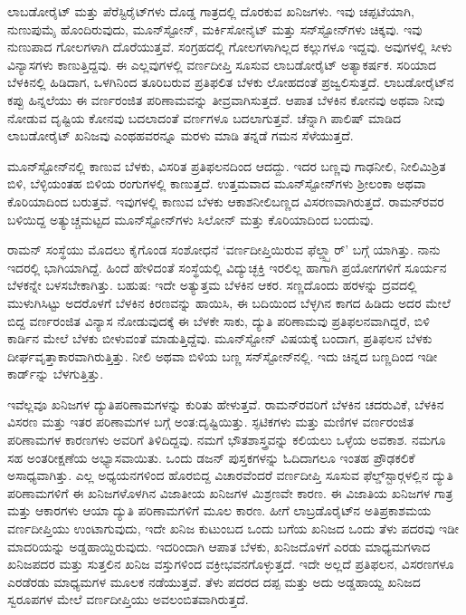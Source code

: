 ಲಾಬಡೋರೈಟ್ ಮತ್ತು ಪೆರೆಸ್ಟಿರೈಟ್‍ಗಳು ದೊಡ್ಡ ಗಾತ್ರದಲ್ಲಿ ದೊರಕುವ ಖನಿಜಗಳು. ಇವು ಚಪ್ಪಟೆಯಾಗಿ, ನುಣುಪುಮೈ ಹೊಂದಿರುವುದು, ಮೂನ್‍ಸ್ಟೋನ್, ಮರ್ಕಿಸೋನೈಟ್ ಮತ್ತು ಸನ್‍ಸ್ಟೋನ್‍ಗಳು ಚಿಕ್ಕವು. ಇವು ನುಣುಪಾದ ಗೋಲಗಳಾಗಿ ದೊರೆಯುತ್ತವೆ. ಸಂಗ್ರಹದಲ್ಲಿ ಗೋಲಗಳಾಗಿಲ್ಲದ ಕಲ್ಲುಗಳೂ ಇದ್ದವು. ಅವುಗಳಲ್ಲಿ ಸೀಳು ವಿನ್ಯಾಸಗಳು ಕಾಣುತ್ತಿದ್ದವು. ಈ ಎಲ್ಲವುಗಳಲ್ಲಿ ವರ್ಣದೀಪ್ತಿ ಸೂಸುವ ಲಾಬಡೋರೈಟ್ ಅತ್ಯಾಕರ್ಷಕ. ಸರಿಯಾದ ಬೆಳಕಿನಲ್ಲಿ ಹಿಡಿದಾಗ, ಒಳಗಿನಿಂದ ತೂರಿಬರುವ ಪ್ರತಿಫಲಿತ ಬೆಳಕು ಲೋಹದಂತೆ ಪ್ರಜ್ವಲಿಸುತ್ತದೆ. ಲಾಬಡೋರೈಟ್‍ನ ಕಪ್ಪು ಹಿನ್ನಲೆಯು ಈ ವರ್ಣರಂಜಿತ ಪರಿಣಾಮವನ್ನು ತೀವ್ರವಾಗಿಸುತ್ತದೆ. ಆಪಾತ ಬೆಳಕಿನ ಕೋನವು ಅಥವಾ ನೀವು ನೋಡುವ ದೃಷ್ಟಿಯ ಕೋನವು ಬದಲಾದಂತೆ ವರ್ಣಗಳೂ ಬದಲಾಗುತ್ತವೆ. ಚೆನ್ನಾಗಿ ಪಾಲಿಷ್ ಮಾಡಿದ ಲಾಬಡೋರೈಟ್ ಖನಿಜವು ಎಂಥಹವರನ್ನೂ ಮರಳು ಮಾಡಿ ತನ್ನಡೆ ಗಮನ ಸೆಳೆಯುತ್ತದೆ.

ಮೂನ್‍ಸ್ಟೋನ್‍ನಲ್ಲಿ ಕಾಣುವ ಬೆಳಕು, ವಿಸರಿತ ಪ್ರತಿಫಲನದಿಂದ ಆದದ್ದು. ಇದರ ಬಣ್ಣವು ಗಾಢನೀಲಿ, ನೀಲಿಮಿಶ್ರಿತ ಬಿಳಿ, ಬೆಳ್ಳಿಯಂತಹ ಬಿಳಿಯ ರಂಗುಗಳಲ್ಲಿ ಕಾಣುತ್ತದೆ. ಉತ್ತಮವಾದ ಮೂನ್‍ಸ್ಟೋನ್‍ಗಳು ಶ‍್ರೀಲಂಕಾ ಅಥವಾ ಕೊರಿಯಾದಿಂದ ಬರುತ್ತವೆ. ಇವುಗಳಲ್ಲಿ ಕಾಣುವ ಬೆಳಕು ಆಕಾಶನೀಲಿಬಣ್ಣದ ವಿಸರಣವಾಗಿರುತ್ತದೆ. ರಾಮನ್‍ರವರ ಬಳಿಯಿದ್ದ ಅತ್ಯುಚ್ಚಮಟ್ಟದ ಮೂನ್‍ಸ್ಟೋನ್‍ಗಳು ಸಿಲೋನ್ ಮತ್ತು ಕೊರಿಯಾದಿಂದ ಬಂದುವು.

ರಾಮನ್ ಸಂಸ್ಥೆಯು ಮೊದಲು ಕೈಗೊಂಡ ಸಂಶೋಧನೆ ‘ವರ್ಣದೀಪ್ತಿಯಿರುವ ಫೆಲ್ಡ್ಸ್ಪಾರ್’ ಬಗ್ಗೆ ಯಾಗಿತ್ತು. ನಾನು ಇದರಲ್ಲಿ ಭಾಗಿಯಾಗಿದ್ದೆ. ಹಿಂದೆ ಹೇಳಿದಂತೆ ಸಂಸ್ಥೆಯಲ್ಲಿ ವಿದ್ಯುಚ್ಛಕ್ತಿ ಇರಲಿಲ್ಲ ಹಾಗಾಗಿ ಪ್ರಯೋಗಗಳಿಗೆ ಸೂರ್ಯನ ಬೆಳಕನ್ನೇ ಬಳಸಬೇಕಾಗಿತ್ತು. ಬಹುಷ: ಇದೇ ಅತ್ಯುತ್ತಮ ಬೆಳಕಿನ ಆಕರ. ಸಣ್ಣದೊಂದು ಹರಳನ್ನು ದ್ರವದಲ್ಲಿ ಮುಳುಗಿಸಿಟ್ಟು ಅದರೊಳಗೆ ಬೆಳಕಿನ ಕಿರಣವನ್ನು ಹಾಯಿಸಿ, ಈ ಬದಿಯಿಂದ ಬೆಳ್ಳಗಿನ ಕಾಗದ ಹಿಡಿದು ಅದರ ಮೇಲೆ ಬಿದ್ದ ವರ್ಣರಂಜಿತ ವಿನ್ಯಾಸ ನೋಡುವುದಕ್ಕೆ ಈ ಬೆಳಕೇ ಸಾಕು, ದ್ಯುತಿ ಪರಿಣಾಮವು ಪ್ರತಿಫಲನವಾಗಿದ್ದರೆ, ಬಿಳಿ ಕಾರ್ಡಿನ ಮೇಲೆ ಬೆಳಕು ಬೀಳುವಂತೆ ಮಾಡುತ್ತಿದ್ದೆವು. ಮೂನ್‍ಸ್ಟೋನ್ ವಿಷಯಕ್ಕೆ ಬಂದಾಗ, ಪ್ರತಿಫಲನ ಬೆಳಕು ದೀರ್ಘವೃತ್ತಾಕಾರವಾಗಿರುತ್ತಿತ್ತು. ನೀಲಿ ಅಥವಾ ಬಿಳಿಯ ಬಣ್ಣ ಸನ್‍ಸ್ಟೋನ್‍ನಲ್ಲಿ. ಇದು ಚಿನ್ನದ ಬಣ್ಣದಿಂದ ಇಡೀ ಕಾರ್ಡ್‌ನ್ನು ಬೆಳಗುತ್ತಿತ್ತು.

ಇವೆಲ್ಲವೂ ಖನಿಜಗಳ ದ್ಯುತಿಪರಿಣಾಮಗಳನ್ನು ಕುರಿತು ಹೇಳುತ್ತವೆ. ರಾಮನ್‍ರವರಿಗೆ ಬೆಳಕಿನ ಚದರುವಿಕೆ, ಬೆಳಕಿನ ವಿಸರಣ ಮತ್ತು ಇತರ ಪರಿಣಾಮಗಳ ಬಗ್ಗೆ ಅಂತ:ದೃಷ್ಟಿಯಿತ್ತು. ಸ್ಫಟಿಕಗಳು ಮತ್ತು ಮಣಿಗಳ ವರ್ಣರಂಜಿತ ಪರಿಣಾಮಗಳ ಕಾರಣಗಳು ಅವರಿಗೆ ತಿಳಿದಿದ್ದವು. ನಮಗೆ ಭೌತಶಾಸ್ತ್ರವನ್ನು ಕಲಿಯಲು ಒಳ್ಳೆಯ ಅವಕಾಶ. ನಮಗೂ ಸಹ ಅಂತರೀಕ್ಷಣೆಯ ಅಭ್ಯಾಸವಾಯಿತು. ಒಂದು ಡಜನ್ ಪುಸ್ತಕಗಳನ್ನು ಓದಿದಾಗಲೂ ಇಂತಹ ಪ್ರೌಢಕಲಿಕೆ ಅಸಾಧ್ಯವಾಗಿತ್ತು. ಎಲ್ಲ ಅಧ್ಯಯನಗಳಿಂದ ಹೊರಬಿದ್ದ ವಿಚಾರವೆಂದರೆ ವರ್ಣದೀಪ್ತಿ ಸೂಸುವ ಫೆಲ್ಡ್‌ಸ್ಟಾರ್‍ಗಳಲ್ಲಿನ ದ್ಯುತಿ ಪರಿಣಾಮಗಳಿಗೆ ಈ ಖನಿಜಗಳೊಳಗಿನ ವಿಜಾತೀಯ ಖನಿಜಗಳ ಮಿಶ್ರಣವೇ ಕಾರಣ. ಈ ವಿಜಾತಿಯ ಖನಿಜಗಳ ಗಾತ್ರ ಮತ್ತು ಆಕಾರಗಳು ಆಯಾ ದ್ಯುತಿ ಪರಿಣಾಮಗಳಿಗೆ ಮೂಲ ಕಾರಣ. ಹೀಗೆ ಲಾಬ್ರಡೊರೈಟ್‍ನ ಅತಿಪ್ರಕಾಶಮಯ ವರ್ಣದೀಪ್ತಿಯು ಉಂಟಾಗುವುದು, ಇದೇ ಖನಿಜ ಕುಟುಂಬದ ಒಂದು ಬಗೆಯ ಖನಿಜದ ಒಂದು ತೆಳು ಪದರವು ಇಡೀ ಮಾದರಿಯನ್ನು ಅಡ್ಡಹಾಯ್ದಿರುವುದು. ಇದರಿಂದಾಗಿ ಆಪಾತ ಬೆಳಕು, ಖನಿಜದೊಳಗೆ ಎರಡು ಮಾಧ್ಯಮಗಳಾದ ಖನಿಜಪದರ ಮತ್ತು ಸುತ್ತಲಿನ ಖನಿಜ ವಸ್ತುಗಳಿಂದ ವಕ್ರೀಭವನಗೊಳ್ಳುತ್ತದೆ. ಇದೇ ಅಲ್ಲದೆ ಪ್ರತಿಫಲನ, ವಿಸರಣಗಳೂ ಎರಡೆರಡು ಮಾಧ್ಯಮಗಳ ಮೂಲಕ ನಡೆಯುತ್ತವೆ. ತೆಳು ಪದರದ ದಪ್ಪ ಮತ್ತು ಅದು ಅಡ್ಡಹಾಯ್ದ ಖನಿಜದ ಸ್ವರೂಪಗಳ ಮೇಲೆ ವರ್ಣದೀಪ್ತಿಯು ಅವಲಂಬಿತವಾಗಿರುತ್ತದೆ.

